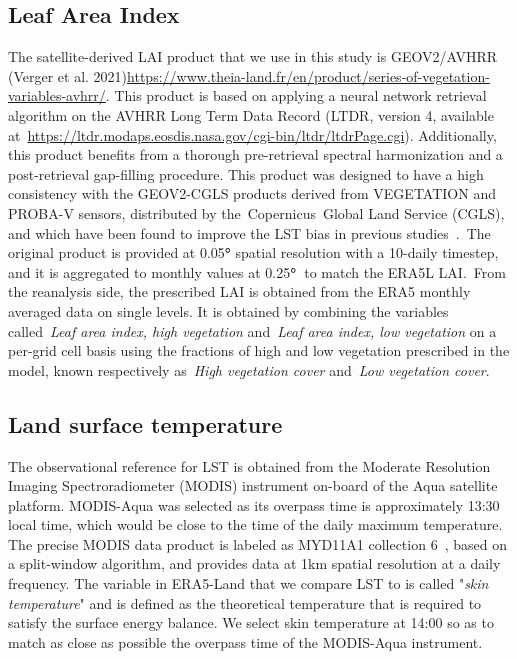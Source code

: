 \documentclass[gmd, manuscript]{copernicus}
\providecommand{\DIFadd}[1]{{\protect\color{blue}\uwave{#1}}} %
\providecommand{\DIFaddbegin}{} %
\providecommand{\DIFaddend}{} %
\begin{document}
\subsection{Leaf Area Index}

The satellite-derived LAI product that we use in this study is
GEOV2/AVHRR (Verger et al. 2021)\DIFaddbegin \DIFadd{, which is available at~}\url{https://www.theia-land.fr/en/product/series-of-vegetation-variables-avhrr/}\DIFaddend . This product is based on applying a
neural network retrieval algorithm on the AVHRR Long Term Data Record
(LTDR, version 4, available
at~\url{https://ltdr.modaps.eosdis.nasa.gov/cgi-bin/ltdr/ltdrPage.cgi}).
Additionally, this product benefits from a thorough pre-retrieval
spectral harmonization and a post-retrieval gap-filling procedure. This
product was designed to have a high consistency with the GEOV2-CGLS
products derived from VEGETATION and PROBA-V sensors, distributed by
the~Copernicus~Global Land Service (CGLS), and which have been found to
improve the LST bias in previous studies~\citep{Nogueira_2020,Nogueira_2021}.~The
original product is provided at 0.05\textbf{°} spatial resolution with a
10-daily timestep, and it is aggregated to monthly values at
0.25\textbf{°~}to match the ERA5L LAI.~{From the reanalysis side, the
prescribed LAI is obtained from the ERA5 monthly averaged data on single
levels.} It is obtained by combining the variables called~\emph{{Leaf}
area index, high vegetation} and~\emph{Leaf area index, low vegetation}
on a per-grid cell basis using the fractions of high and low vegetation
prescribed in the model, known respectively as~\emph{High vegetation
cover} and~\emph{Low vegetation cover}.~


\subsection{Land surface temperature}

The observational reference for LST is obtained from the Moderate
Resolution Imaging Spectroradiometer (MODIS) instrument on-board of the
Aqua satellite platform. MODIS-Aqua was selected as its overpass time is
approximately 13:30 local time, which would be close to the time of the
daily maximum temperature. The precise MODIS data product is labeled as
MYD11A1 collection 6~\citep{Wan_2015}, based on a split-window
algorithm, and provides data at 1km spatial resolution at a daily
frequency. The variable in ERA5-Land that we compare LST to is called
"\emph{skin temperature}" and is defined as the theoretical temperature
that is required to satisfy the surface energy balance. We select skin
temperature at 14:00 so as to match as close as possible the overpass
time of the MODIS-Aqua instrument.~
\end{document}
